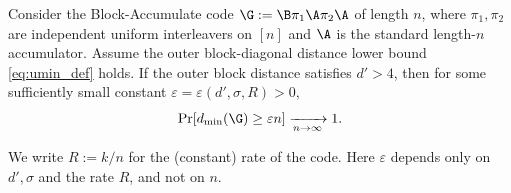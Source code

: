 \begin{theorem}
\label{thm:ba_linear_distance}
Consider the Block-Accumulate code $\G:=\B\pi_1\A\pi_2\A$ of length $n$, where $\pi_1,\pi_2$ are independent uniform interleavers on $[n]$ and $\A$ is the standard length-$n$ accumulator.
Assume the outer block-diagonal distance lower bound \eqref{eq:umin_def} holds.
If the outer block distance satisfies $d'>4$, then for some sufficiently small
constant $\varepsilon=\varepsilon(d',\sigma,R)>0$,
\[
\Pr[d_{\min}(\G)\ge \varepsilon n]\xrightarrow[n\to\infty]{}1.
\]
\end{theorem}
\begin{remark}
  We write $R:=k/n$ for the (constant) rate of the code. Here $\varepsilon$ depends only on $d', \sigma$ and the rate $R$, and not on $n$.
\end{remark}
